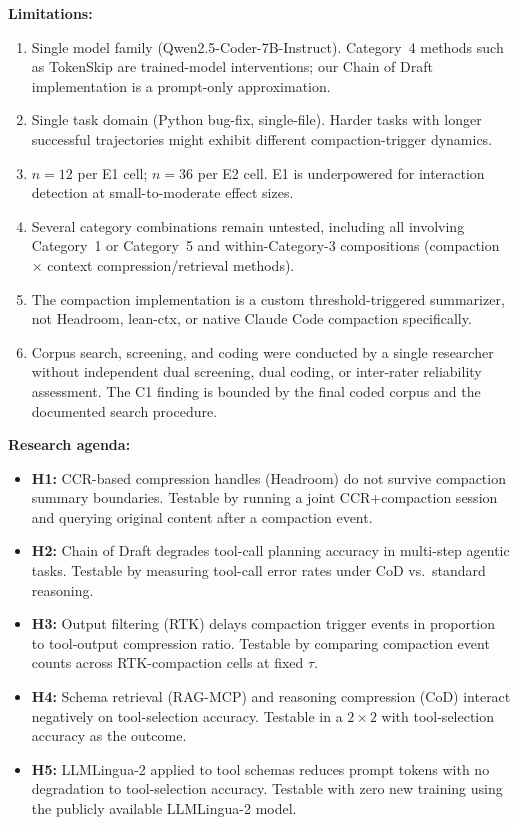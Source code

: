 \documentclass{article}
\begin{document}
\textbf{Limitations:}
\begin{enumerate}
\item Single model family (Qwen2.5-Coder-7B-Instruct). Category~4 methods such as TokenSkip are trained-model interventions; our Chain of Draft implementation is a prompt-only approximation.
\item Single task domain (Python bug-fix, single-file). Harder tasks with longer successful trajectories might exhibit different compaction-trigger dynamics.
\item $n=12$ per E1 cell; $n=36$ per E2 cell. E1 is underpowered for interaction detection at small-to-moderate effect sizes.
\item Several category combinations remain untested, including all involving Category~1 or Category~5 and within-Category-3 compositions (compaction $\times$ context compression/retrieval methods).
\item The compaction implementation is a custom threshold-triggered summarizer, not Headroom, lean-ctx, or native Claude Code compaction specifically.
\item Corpus search, screening, and coding were conducted by a single researcher without independent dual screening, dual coding, or inter-rater reliability assessment. The C1 finding is bounded by the final coded corpus and the documented search procedure.
\end{enumerate}

\textbf{Research agenda:}
\begin{itemize}
\item \textbf{H1:} CCR-based compression handles (Headroom) do not survive compaction summary boundaries. Testable by running a joint CCR+compaction session and querying original content after a compaction event.
\item \textbf{H2:} Chain of Draft degrades tool-call planning accuracy in multi-step agentic tasks. Testable by measuring tool-call error rates under CoD vs.\ standard reasoning.
\item \textbf{H3:} Output filtering (RTK) delays compaction trigger events in proportion to tool-output compression ratio. Testable by comparing compaction event counts across RTK-compaction cells at fixed $\tau$.
\item \textbf{H4:} Schema retrieval (RAG-MCP) and reasoning compression (CoD) interact negatively on tool-selection accuracy. Testable in a $2\times2$ with tool-selection accuracy as the outcome.
\item \textbf{H5:} LLMLingua-2 applied to tool schemas reduces prompt tokens with no degradation to tool-selection accuracy. Testable with zero new training using the publicly available LLMLingua-2 model.
\end{itemize}
\end{document}
